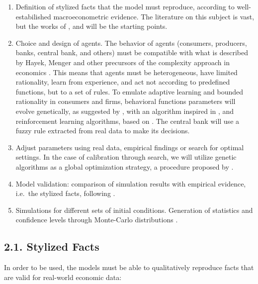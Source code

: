 \documentclass[11pt,]{article}
\begin{document}
\begin{enumerate}
\def\labelenumi{\roman{enumi}.}
\item
  Definition of stylized facts that the model must reproduce, according
  to well-estabilished macroeconometric evidence. The literature on this
  subject is vast, but the works of \citet{delligatti1}, \citet{dosi1}
  and \citet{dosi2} will be the starting points.
\item
  Choice and design of agents. The behavior of agents (consumers,
  producers, banks, central bank, and others) must be compatible with
  what is described by Hayek, Menger and other precursors of the
  complexity approach in economics \citep{barbieri}. This means that
  agents must be heterogeneous, have limited rationality, learn from
  experience, and act not according to predefined functions, but to a
  set of rules. To emulate adaptive learning and bounded rationality in
  consumers and firms, behavioral functions parameters will evolve
  genetically, as suggested by \citet{mandel}, with an algorithm
  inspired in \citet{delligatti3}, and reinforcement learning
  algorithms, based on \citet{tesfatsion1}. The central bank will use a
  fuzzy rule extracted from real data to make its decisions.
\item
  Adjust parameters using real data, empirical findings or search for
  optimal settings. In the case of calibration through search, we will
  utilize genetic algorithms as a global optimization strategy, a
  procedure proposed by \citet{judd1}.
\item
  Model validation: comparison of simulation results with empirical
  evidence, i.e.~the stylized facts, following \citet{tesfatsion2}.
\item
  Simulations for different sets of initial conditions. Generation of
  statistics and confidence levels through Monte-Carlo distributions
  \citep{fagiolo1}.
\end{enumerate}

\subsection{2.1. Stylized Facts}\label{stylized-facts}

In order to be used, the models must be able to qualitatively reproduce
facts that are valid for real-world economic data:
\end{document}

